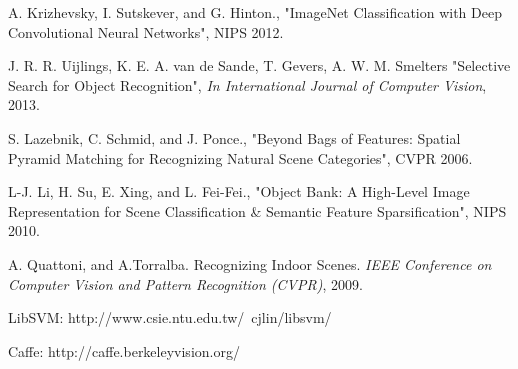 \documentclass[letterpaper,twocolumn,11pt]{article}
\begin{document}
\begin{thebibliography}{10}

 A. Krizhevsky, I. Sutskever, and G. Hinton.,
"ImageNet Classification with Deep Convolutional Neural Networks",
NIPS 2012.

 J. R. R. Uijlings, K. E. A. van de Sande,
T. Gevers, A. W. M. Smelters
"Selective Search for Object Recognition",
\emph{In International Journal of Computer Vision}, 2013.

 S. Lazebnik, C. Schmid, and J. Ponce.,
"Beyond Bags of Features:
Spatial Pyramid Matching for Recognizing Natural Scene Categories",
CVPR 2006.

 L-J. Li, H. Su, E. Xing, and L. Fei-Fei.,
"Object Bank: A High-Level Image Representation for Scene Classification
\& Semantic Feature Sparsification",
NIPS 2010.

 A. Quattoni, and A.Torralba. Recognizing Indoor Scenes.
\emph{IEEE Conference on Computer Vision and Pattern Recognition (CVPR)},
2009.

 LibSVM: http://www.csie.ntu.edu.tw/~cjlin/libsvm/

 Caffe: http://caffe.berkeleyvision.org/


\end{thebibliography}
\end{document}
